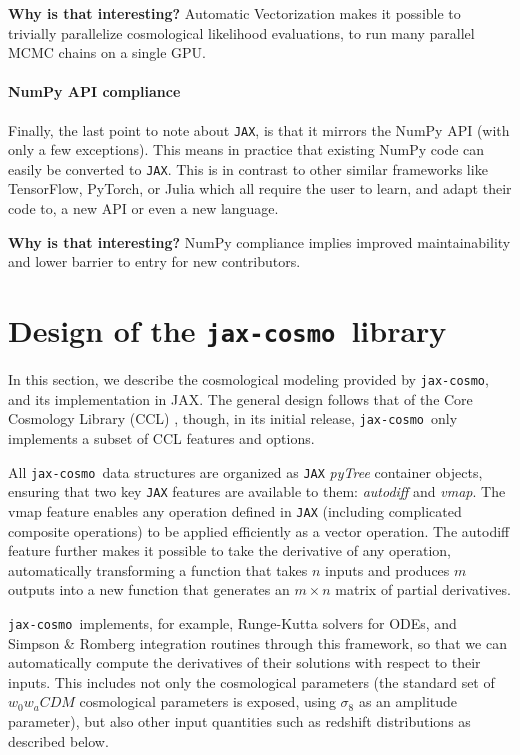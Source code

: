 \documentclass[twocolumn,twocolappendix,nofootinbib,iop]{openjournal}
\newcommand{\jaxcosmo}{\texttt{jax-cosmo}}
\begin{document}
\textbf{Why is that interesting?} Automatic Vectorization makes it possible to trivially parallelize cosmological likelihood evaluations, to run many parallel MCMC chains on a single GPU.

\paragraph{\textbf{NumPy API compliance}} Finally, the last point to note about \texttt{JAX}, is that it mirrors the NumPy API (with only a few exceptions). This means in practice that existing NumPy code can easily be converted to \texttt{JAX}. This is in contrast to other similar frameworks like TensorFlow, PyTorch, or Julia which all require the user to learn, and adapt their code to, a new API or even a new language. 

\textbf{Why is that interesting?} NumPy compliance implies improved maintainability and lower barrier to entry for new contributors.


\section{Design of the \jaxcosmo\ library}
\label{sec-jaxcosmo-design}

In this section, we describe the cosmological modeling provided by \jaxcosmo, and its implementation in JAX. The general design follows that of the Core Cosmology Library (CCL) \citep{2019ApJS..242....2C}, though, in its initial release,
 \jaxcosmo\ only implements a subset of CCL features and options.

All \jaxcosmo\ data structures are organized as \texttt{JAX} \textit{pyTree} container objects, ensuring that two key \texttt{JAX} features are available to them: \textit{autodiff} and \textit{vmap}. The vmap feature enables any operation defined in \texttt{JAX} (including complicated composite operations) to be applied efficiently as a vector operation. The autodiff feature further makes it possible to take the derivative of any operation, automatically transforming a function that takes $n$ inputs and produces $m$ outputs into a new function that generates an $m \times n$ matrix of partial derivatives.

\jaxcosmo\ implements, for example, Runge-Kutta solvers for ODEs, and Simpson \& Romberg integration routines through this framework, so that we can automatically compute the derivatives of their solutions with respect to their inputs. This includes not only the cosmological parameters (the standard set of $w_0 w_a CDM$ cosmological parameters is exposed, using $\sigma_8$ as an amplitude parameter), but also other input quantities such as redshift distributions as described below.
\end{document}

